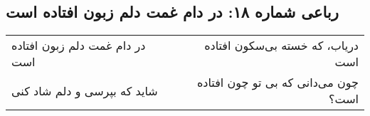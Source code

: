 \begin{center}
\section*{رباعی شماره ۱۸: در دام غمت دلم زبون افتاده است}
\label{sec:018}
\begin{longtable}{l p{0.5cm} r}
در دام غمت دلم زبون افتاده است
&&
دریاب، که خسته بی‌سکون افتاده است
\\
شاید که بپرسی و دلم شاد کنی
&&
چون می‌دانی که بی تو چون افتاده است؟
\\
\end{longtable}
\end{center}
